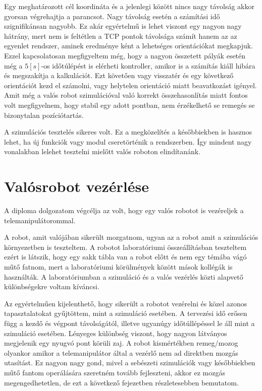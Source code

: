 
Egy meghatározott cél koordináta és a jelenlegi között nincs nagy távolság akkor gyorsan végrehajtja a parancsot. Nagy távolság esetén a számítási idő szignifikánsan nagyobb. Ez akár egyértelmű is lehet viszont egy nagyon nagy hátrány, mert nem is feltétlen a TCP pontok távolsága számít hanem az az egyenlet rendszer, aminek eredménye ként a lehetséges orientációkat megkapjuk. Ezzel kapcsolatosan megfigyeltem még, hogy a nagyon összetett pályák esetén még a $5[s]$-os időtúlépést is elérheti kontroller, amikor is a számítás kiáll hibára és megszakítja a kalkulációt. Ezt követően vagy visszatér és egy következő orientációt kezd el számolni, vagy helytelen orientáció miatt beavatkozást igényel. Amit még a valós robot szimulációval való korrekt összehasonlítás miatt fontos volt megfigyelnem, hogy stabil egy adott pontban, nem érzékelhető se remegés se bizonytalan pozíciótartás.

A szimulációs tesztelés sikeres volt. Ez a megközelítés a későbbiekben is hasznos lehet, ha új funkciók vagy modul cseretörténik a rendszerben. Így mindent nagy vonalakban lelehet tesztelni mielőtt valós roboton elindítanánk.


\section{Valósrobot vezérlése}

A diploma dolgozatom végcélja az volt, hogy egy valós robotot is vezéreljek a telemanipulátorommal. 

A robot, amit valójában sikerült mozgatnom, ugyan az a robot amit a szimulációs környezetben is teszteltem. A robotot laboratóriumi összeállításban teszteltem ezért is látszik, hogy egy sakk tábla van a robot előtt és nem egy témába vágó műtő fatnom, mert a laboratóriumi körülmények között mások kollégák is használták. A laboratóriumban a szimuláció és a valós vezérlés közti alapvető különbségekre voltam kíváncsi.


Az egyértelműen kijelenthető, hogy sikerült a robotot vezérelni és közel azonos tapasztalatokat gyűjtöttem, mint a szimuláció esetében. A tervezési idő erősen függ a kezdő és végpont távolságától, illetve ugyanúgy időtúllépéssel le áll mint a szimuláció esetében. Lényeges különbség viszont, hogy nagyon látványos megjelenik egy nyugvó pont körüli zaj. A robot kismértékben remeg/mozog olyankor amikor a telemanipulátor által a vezérlő nem ad direktben mozgás utasítást. Ez nagyon nagy gond, mivel a sebészeti szimulációk vagy későbbiekben műtő fantom operálására szeretném tovább fejleszteni, akkor ez mozgás megengedhetetlen, de ezt a következő fejezetben részletesebben bemutatom.

